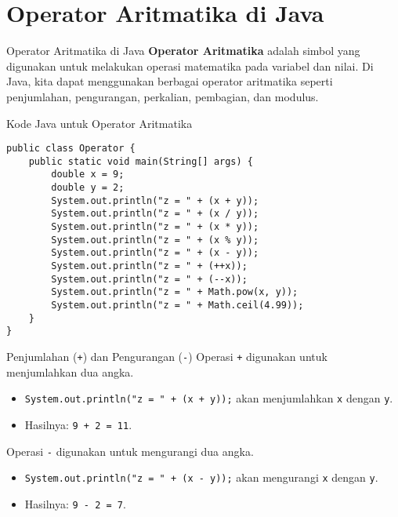 \documentclass[aspectratio=169, table]{beamer}
\begin{document}
\section{Operator Aritmatika di Java}

\begin{frame}{Operator Aritmatika di Java}
	\textbf{Operator Aritmatika} adalah simbol yang digunakan untuk melakukan operasi matematika pada variabel dan nilai. Di Java, kita dapat menggunakan berbagai operator aritmatika seperti penjumlahan, pengurangan, perkalian, pembagian, dan modulus.
\end{frame}

\begin{frame}[fragile]{Kode Java untuk Operator Aritmatika}
	\vspace{15pt}
\begin{lstlisting}[style=JavaStyle]
public class Operator {
	public static void main(String[] args) {
		double x = 9;
		double y = 2;
		System.out.println("z = " + (x + y));
		System.out.println("z = " + (x / y));
		System.out.println("z = " + (x * y));
		System.out.println("z = " + (x % y));
		System.out.println("z = " + (x - y));
		System.out.println("z = " + (++x));
		System.out.println("z = " + (--x));
		System.out.println("z = " + Math.pow(x, y));    
		System.out.println("z = " + Math.ceil(4.99));    
	}
}
\end{lstlisting}
\end{frame}

\begin{frame}{Penjumlahan (\texttt{+}) dan Pengurangan (\texttt{-})}
	Operasi \texttt{+} digunakan untuk menjumlahkan dua angka.
	\begin{itemize}
		\item \texttt{System.out.println("z = " + (x + y));} akan menjumlahkan \texttt{x} dengan \texttt{y}.
		\item Hasilnya: \texttt{9 + 2 = 11}.
	\end{itemize}
		Operasi \texttt{-} digunakan untuk mengurangi dua angka.
	\begin{itemize}
		\item \texttt{System.out.println("z = " + (x - y));} akan mengurangi \texttt{x} dengan \texttt{y}.
		\item Hasilnya: \texttt{9 - 2 = 7}.
	\end{itemize}
\end{frame}
\end{document}
